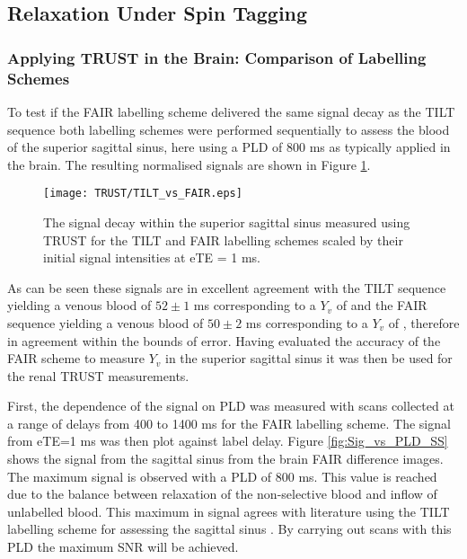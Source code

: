 \subsection{\ttwo Relaxation Under Spin Tagging}
\subsubsection{Applying \ac{TRUST} in the Brain: Comparison of Labelling Schemes}

To test if the \ac{FAIR} labelling scheme delivered the same signal decay as the \ac{TILT} sequence both labelling schemes were performed sequentially to assess the blood \ttwo of the superior sagittal sinus, here using a \ac{PLD} of 800 ms as typically applied in the brain. The resulting normalised signals are shown in Figure \ref{fig:TILT_vs_FAIR}.
\begin{figure}[H]
	\centering
	\texttt{[image: TRUST/TILT\_vs\_FAIR.eps]}
	\caption{The signal decay within the superior sagittal sinus measured using \ac{TRUST} for the \ac{TILT} and \ac{FAIR} labelling schemes scaled by their initial signal intensities at eTE = 1 ms.}
	\label{fig:TILT_vs_FAIR}	
\end{figure}

As can be seen these signals are in excellent agreement with the \ac{TILT} sequence yielding a venous blood \ttwo of $52\pm1$ ms corresponding to a $Y_v$ of  and the \ac{FAIR} sequence yielding a venous blood \ttwo of $50\pm2$ ms corresponding to a $Y_v$ of , therefore in agreement within the bounds of error. Having evaluated the accuracy of the \ac{FAIR} scheme to measure $Y_v$ in the superior sagittal sinus it was then be used for the renal \ac{TRUST} measurements.

First, the dependence of the signal on \ac{PLD} was measured with scans collected at a range of delays from 400 to 1400 ms for the \ac{FAIR} labelling scheme. The signal from \ac{eTE}=1 ms was then plot against label delay. Figure \ref{fig:Sig_vs_PLD_SS} shows the signal from the sagittal sinus from the brain \ac{FAIR} difference images. The maximum signal is observed with a \ac{PLD} of 800 ms. This value is reached due to the balance between \tone relaxation of the non-selective blood and inflow of unlabelled blood. This maximum in signal agrees with literature using the \ac{TILT} labelling scheme for assessing the sagittal sinus \cite{lu_quantitative_2008}. By carrying out scans with this \ac{PLD} the maximum \ac{SNR} will be achieved. 

